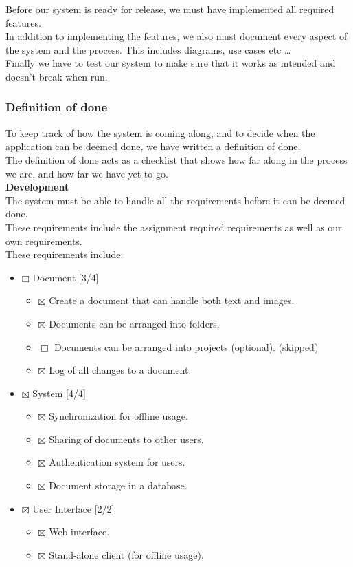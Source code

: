 \documentclass[11pt]{article}
\begin{document}
Before our system is ready for release, we must have implemented all required features. \\
In addition to implementing the features, we also must document every aspect of the system and the process. This includes diagrams, use cases etc \ldots{} \\
Finally we have to test our system to make sure that it works as intended and doesn't break when run. \\

\subsubsection{Definition of done}
\label{sec-5-1-1}

To keep track of how the system is coming along, and to decide when the application can be deemed done, we have written a definition of done. \\
The definition of done acts as a checklist that shows how far along in the process we are, and how far we have yet to go. \\

\textbf{Development} \\
\label{sec-5-1-1-1}%
The system must be able to handle all the requirements before it can be deemed done. \\
These requirements include the assignment required requirements as well as our own requirements. \\

These requirements include:
\begin{itemize}
\item $\boxminus$ Document [3/4]
\begin{itemize}
\item $\boxtimes$ Create a document that can handle both text and images.
\item $\boxtimes$ Documents can be arranged into folders.
\item $\Box$ Documents can be arranged into projects (optional). (skipped)
\item $\boxtimes$ Log of all changes to a document.
\end{itemize}
\item $\boxtimes$ System [4/4]
\begin{itemize}
\item $\boxtimes$ Synchronization for offline usage.
\item $\boxtimes$ Sharing of documents to other users.
\item $\boxtimes$ Authentication system for users.
\item $\boxtimes$ Document storage in a database.
\end{itemize}
\item $\boxtimes$ User Interface [2/2]
\begin{itemize}
\item $\boxtimes$ Web interface.
\item $\boxtimes$ Stand-alone client (for offline usage).
\end{itemize}
\end{itemize}
\end{document}

